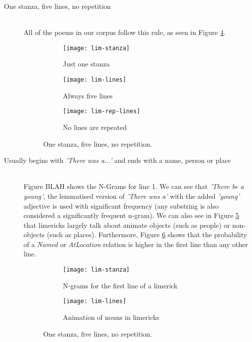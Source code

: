\begin{description}
\item[One stanza, five lines, no repetition]  \hfill \\
All of the poems in our corpus follow this rule, as seen in Figure \ref{fig:lim1}.
\begin{figure}[H]
\centering
\begin{subfigure}[t]{0.3\textwidth}
	\centering
    \texttt{[image: lim-stanza]}
    \caption{Just one stanza}
    \label{fig:lim-stanza}
\end{subfigure}
\begin{subfigure}[t]{0.3\textwidth}
	\centering
    \texttt{[image: lim-lines]}
    \caption{Always five lines}
    \label{fig:lim-lines}
\end{subfigure}
\begin{subfigure}[t]{0.3\textwidth}
	\centering
    \texttt{[image: lim-rep-lines]}
    \caption{No lines are repeated}
    \label{fig:lim-rep-lines}
\end{subfigure}
\caption{One stanza, five lines, no repetition.}
\label{fig:lim1}
\end{figure}


\item[Usually begins with \textit{'There was a...'} and ends with a name, person or place]  \hfill \\
Figure BLAH shows the N-Grams for line 1. We can see that \textit{'There be a young'}, the lemmatised version of \textit{'There was a'} with the added \textit{'young'} adjective is used with significant frequency (any substring is also considered a significantly frequent n-gram). We can also see in Figure \ref{fig:lim-grams1} that limericks largely talk about animate objects (such as people) or non-objects (such as places). Furthermore, Figure \ref{fig:lim-anim} shows that the probability of a \textit{Named} or \textit{AtLocation} relation is higher in the first line than any other line.

\begin{figure}[H]
\centering
\begin{subfigure}[t]{0.9\textwidth}
	\centering
    \texttt{[image: lim-stanza]}
    \caption{N-grams for the first line of a limerick}
    \label{fig:lim-grams1}
\end{subfigure}
\begin{subfigure}[t]{0.9\textwidth}
	\centering
    \texttt{[image: lim-lines]}
    \caption{Animation of nouns in limericks}
    \label{fig:lim-anim}
\end{subfigure}
\caption{One stanza, five lines, no repetition.}
\label{fig:lim2}
\end{figure}


\end{description}
